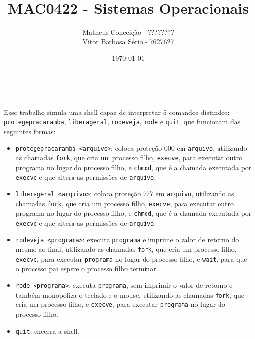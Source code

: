 \documentclass[12pt, a4paper]{article}
\title{MAC0422 - Sistemas Operacionais}
\author{Matheus Conceição - ???????? \\ Vitor Barbosa Sério - 7627627}
\date{\today}
\begin{document}
\makeatletter
\begin{flushright}
\@date
\end{flushright}
\begin{center}
{\Large \@title \\}
{\large \@author}
\end{center}
\makeatother

Esse trabalho simula uma shell capaz de interpretar 5 comandos distindos: \texttt{protegepracaramba}, \texttt{liberageral}, \texttt{rodeveja}, \texttt{rode} e \texttt{quit}, que funcionam das seguintes formas:

\begin{itemize}
\item \texttt{protegepracaramba <arquivo>}: coloca proteção 000 em \texttt{arquivo}, utilizando as chamadas \texttt{fork}, que cria um processo filho, \texttt{execve}, para executar outro programa no lugar do processo filho, e \texttt{chmod}, que é a chamada executada por \texttt{execve} e que altera as permissões de \texttt{arquivo}.


\item \texttt{liberageral <arquivo>}: coloca proteção 777 em \texttt{arquivo}, utilizando as chamadas \texttt{fork}, que cria um processo filho, \texttt{execve}, para executar outro programa no lugar do processo filho, e \texttt{chmod}, que é a chamada executada por \texttt{execve} e que altera as permissões de \texttt{arquivo}.


\item \texttt{rodeveja <programa>}: executa \texttt{programa} e imprime o valor de retorno do mesmo ao final, utilizando as chamadas \texttt{fork}, que cria um processo filho, \texttt{execve}, para executar \texttt{programa} no lugar do processo filho, e \texttt{wait}, para que o processo pai espere o processo filho terminar.


\item \texttt{rode <programa>}: executa \texttt{programa}, sem imprimir o valor de retorno e também monopoliza o teclado e o mouse, utilizando as chamadas \texttt{fork}, que cria um processo filho, e \texttt{execve}, para executar \texttt{programa} no lugar do processo filho.
\item \texttt{quit}: encerra a shell.
\end{itemize}
\end{document}
